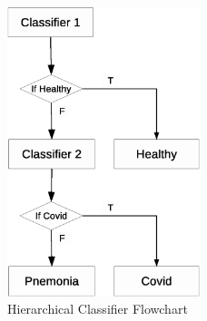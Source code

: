 \documentclass[12pt]{extarticle}
\begin{document}
	\begin{figure}[h]
		\centering
		\includegraphics[width=0.5\textwidth]{pics/Figures/GJU_H.eps}
		\caption{\small{Hierarchical Classifier Flowchart}}
		\label{fig:GJU}
	\end{figure}
	
	
	\newpage
	
	
\end{document}
